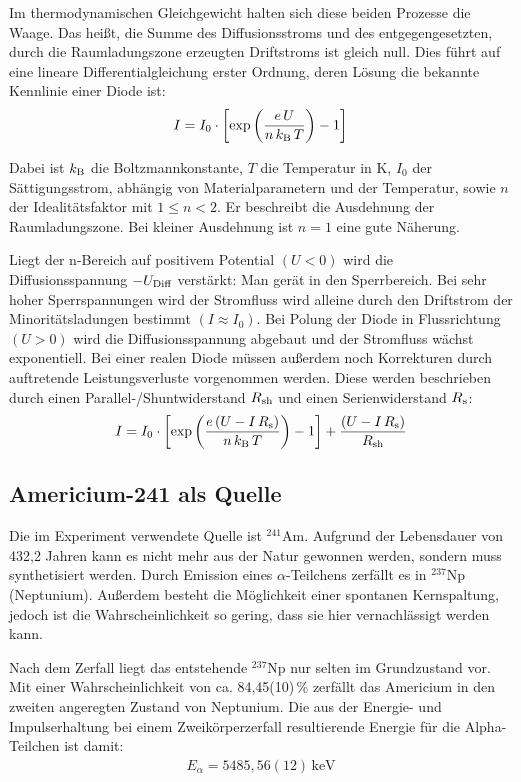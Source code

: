 Im thermodynamischen Gleichgewicht halten sich diese beiden Prozesse die Waage. Das heißt, die Summe des Diffusionsstroms und des entgegengesetzten, durch die Raumladungszone erzeugten Driftstroms ist gleich null. Dies führt auf eine lineare Differentialgleichung erster Ordnung, deren Lösung die bekannte Kennlinie einer Diode ist:
\begin{align}
I=I_0\cdot\left[ \exp\left( \frac{e\,U}{n\,k_\textnormal{B}\,T}\right)  -1\right] 
\end{align} 

\noindent Dabei ist $k_\textnormal{B}$  die Boltzmannkonstante,
$T$ die Temperatur in K, 
$I_0$ der Sättigungsstrom, abhängig von Materialparametern und der Temperatur, sowie
$n$ der Idealitätsfaktor mit $ 1 \leq n < 2$. Er beschreibt die Ausdehnung der Raumladungszone. Bei kleiner Ausdehnung ist $n = 1$ eine gute Näherung.

Liegt der n-Bereich auf positivem Potential $(U<0)$ wird die Diffusionsspannung $-U_\textnormal{Diff}$ verstärkt: Man gerät in den Sperrbereich. Bei sehr hoher Sperrspannungen wird der Stromfluss wird alleine durch den Driftstrom der Minoritätsladungen bestimmt $(I\approx I_0)$. Bei Polung der Diode in Flussrichtung $(U > 0)$ wird die Diffusionsspannung abgebaut und der Stromfluss wächst exponentiell. Bei einer realen Diode müssen außerdem noch Korrekturen durch auftretende Leistungsverluste vorgenommen werden. Diese werden beschrieben durch einen Parallel-/Shuntwiderstand $R_{\textnormal{sh}}$ und einen Serienwiderstand $R_{\textnormal{s}}$:
\begin{align}
I=I_0\cdot\left[ \exp\left( \frac{e\,(U-I\,R_\textnormal{s})}{n\,k_\textnormal{B}\,T}\right)  -1\right] +\frac{(U-I\,R_\textnormal{s})}{R_\textnormal{sh}}
\end{align} 


\subsection{Americium-241 als Quelle}

Die im Experiment verwendete Quelle ist $^{241}$Am. Aufgrund der Lebensdauer
von 432,2 Jahren kann es nicht mehr aus der Natur gewonnen werden, sondern muss synthetisiert werden. Durch Emission eines $\alpha$-Teilchens zerfällt es in $^{237}$Np (Neptunium). Außerdem besteht die Möglichkeit einer spontanen Kernspaltung, jedoch ist die Wahrscheinlichkeit so gering, dass sie hier vernachlässigt werden kann. 

Nach dem Zerfall liegt das entstehende $^{237}$Np nur selten im Grundzustand vor. Mit einer Wahrscheinlichkeit von ca. 84,45(10)\,\% zerfällt das Americium in den zweiten angeregten Zustand von Neptunium. Die aus der Energie- und Impulserhaltung bei einem Zweikörperzerfall resultierende Energie für die Alpha-Teilchen ist damit:
\begin{align*}
	E_\alpha = 5485,56(12)\,\text{keV}
\end{align*}